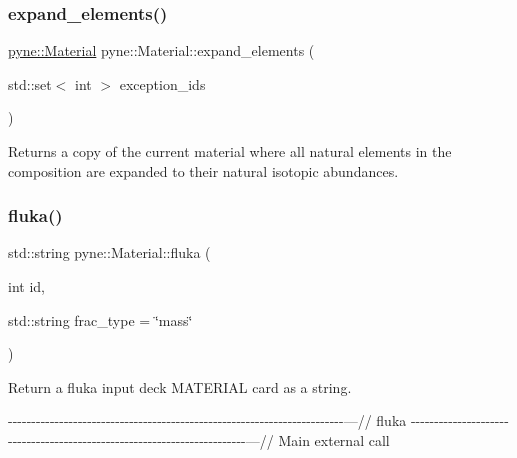 \subsubsection{\texorpdfstring{expand\+\_\+elements()}{expand\_elements()}}
{\footnotesize\ttfamily \hyperlink{classpyne_1_1_material}{pyne\+::\+Material} pyne\+::\+Material\+::expand\+\_\+elements (\begin{DoxyParamCaption}\item[{std\+::set$<$ int $>$}]{exception\+\_\+ids }\end{DoxyParamCaption})}

Returns a copy of the current material where all natural elements in the composition are expanded to their natural isotopic abundances. \mbox{\label{classpyne_1_1_material_a6bcd10072abbf3e9a8bcaa466f8be569}} 
\subsubsection{\texorpdfstring{fluka()}{fluka()}}
{\footnotesize\ttfamily std\+::string pyne\+::\+Material\+::fluka (\begin{DoxyParamCaption}\item[{int}]{id,  }\item[{std\+::string}]{frac\+\_\+type = {\ttfamily \char`\"{}mass\char`\"{}} }\end{DoxyParamCaption})}



Return a fluka input deck M\+A\+T\+E\+R\+I\+AL card as a string. 

-\/-\/-\/-\/-\/-\/-\/-\/-\/-\/-\/-\/-\/-\/-\/-\/-\/-\/-\/-\/-\/-\/-\/-\/-\/-\/-\/-\/-\/-\/-\/-\/-\/-\/-\/-\/-\/-\/-\/-\/-\/-\/-\/-\/-\/-\/-\/-\/-\/-\/-\/-\/-\/-\/-\/-\/-\/-\/-\/-\/-\/-\/-\/-\/-\/-\/-\/-\/-\/-\/-\/-\/---// fluka -\/-\/-\/-\/-\/-\/-\/-\/-\/-\/-\/-\/-\/-\/-\/-\/-\/-\/-\/-\/-\/-\/-\/-\/-\/-\/-\/-\/-\/-\/-\/-\/-\/-\/-\/-\/-\/-\/-\/-\/-\/-\/-\/-\/-\/-\/-\/-\/-\/-\/-\/-\/-\/-\/-\/-\/-\/-\/-\/-\/-\/-\/-\/-\/-\/-\/-\/-\/-\/-\/-\/-\/---// Main external call \mbox{\label{classpyne_1_1_material_a3dd223f881e39c1c6014c2b79c9ee39b}} 
